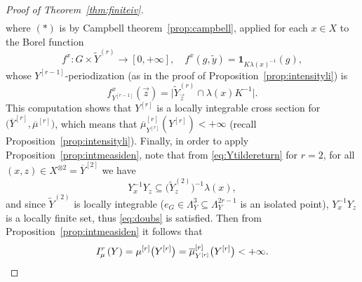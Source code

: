 \documentclass[10pt,a4paper]{amsart}
\begin{document}
\begin{proof}[Proof of Theorem~\ref{thm:finiteiv}]
\begin{align*}
\end{align*}
where \(\left(\ast\right)\) is by Campbell theorem~\ref{prop:campbell}, applied for each \(x\in X\) to the Borel function
\[f^{x}:G\times\widetilde{Y}^{\left(r\right)}\longrightarrow\left[0,+\infty\right],\quad f^{x}\left(g,\widetilde{y}\right)=\mathbf{1}_{K\lambda\left(x\right)^{-1}}\left(g\right),\]
whose \(Y^{\left[r-1\right]}\)-periodization (as in the proof of Proposition~\ref{prop:intensityli}) is
\[f_{Y^{\left[r-1\right]}}^{x}\left(\vec{z}\right)=\big|\widetilde{Y}_{\vec{z}}^{\left(r\right)}\cap\lambda\left(x\right)K^{-1}\big|.\]
This computation shows that \(Y^{\left[r\right]}\) is a locally integrable cross section for \(\big(\overline{Y}^{\left[r\right]},\overline{\mu}^{\left[r\right]}\big)\), which means that \(\overline{\mu}_{Y^{\left[r\right]}}^{\left[r\right]}\left(Y^{\left[r\right]}\right)<+\infty\) (recall Proposition~\ref{prop:intensityli}). Finally, in order to apply Proposition~\ref{prop:intmeasiden}, note that from \eqref{eq:Ytildereturn} for \(r=2\), for all \(\left(x,z\right)\in X^{\otimes 2}=\overline{Y}^{\left[2\right]}\) we have
\[Y_{x}^{-1}Y_{z}\subseteq\big(\widetilde{Y}_{z}^{\left(2\right)}\big)^{-1}\lambda\left(x\right),\]
and since \(\widetilde{Y}^{\left(2\right)}\) is locally integrable (\(e_{G}\in\Lambda_{Y}^{3}\subseteq\Lambda_{Y}^{2r-1}\) is an isolated point), \(Y_{x}^{-1}Y_{z}\) is a locally finite set, thus \eqref{eq:doubs} is satisfied. Then from Proposition~\ref{prop:intmeasiden} it follows that
\[I_{\mu}^{r}\left(Y\right)=\mu^{\left[r\right]}\big(Y^{\left[r\right]}\big)=\overline{\mu}_{Y^{\left[r\right]}}^{\left[r\right]}\big(Y^{\left[r\right]}\big)<+\infty.\qedhere\]
\end{proof}
\end{document}
